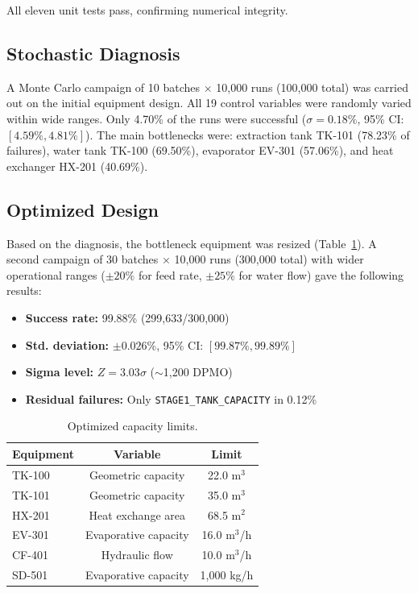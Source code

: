 \documentclass[10pt]{article}
\begin{document}
All eleven unit tests pass, confirming numerical integrity.

\subsection{Stochastic Diagnosis}

A Monte Carlo campaign of 10 batches $\times$ 10,000 runs (100,000 total) was carried out on the initial equipment design. All 19 control variables were randomly varied within wide ranges. Only 4.70\% of the runs were successful ($\sigma = 0.18\%$, 95\% CI: $[4.59\%, 4.81\%]$). The main bottlenecks were: extraction tank TK-101 (78.23\% of failures), water tank TK-100 (69.50\%), evaporator EV-301 (57.06\%), and heat exchanger HX-201 (40.69\%).

\subsection{Optimized Design}

Based on the diagnosis, the bottleneck equipment was resized (Table~\ref{tab:limits}). A second campaign of 30 batches $\times$ 10,000 runs (300,000 total) with wider operational ranges ($\pm20\%$ for feed rate, $\pm25\%$ for water flow) gave the following results:

\begin{itemize}
    \item \textbf{Success rate:} 99.88\% (299,633/300,000)
    \item \textbf{Std. deviation:} $\pm0.026\%$, 95\% CI: $[99.87\%, 99.89\%]$
    \item \textbf{Sigma level:} $Z = 3.03\sigma$ ($\sim$1,200 DPMO)
    \item \textbf{Residual failures:} Only \texttt{STAGE1\_TANK\_CAPACITY} in 0.12\%
\end{itemize}

\begin{table}[!ht]
\centering
\caption{Optimized capacity limits.}
\label{tab:limits}
\small
\begin{tabular}{lcc}
\toprule
Equipment & Variable & Limit \\
\midrule
TK-100 & Geometric capacity & 22.0 m$^3$ \\
TK-101 & Geometric capacity & 35.0 m$^3$ \\
HX-201 & Heat exchange area & 68.5 m$^2$ \\
EV-301 & Evaporative capacity & 16.0 m$^3$/h \\
CF-401 & Hydraulic flow & 10.0 m$^3$/h \\
SD-501 & Evaporative capacity & 1,000 kg/h \\
\bottomrule
\end{tabular}
\end{table}
\end{document}
